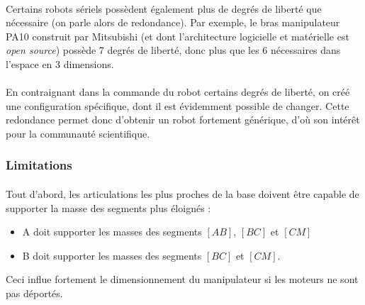 \documentclass[a4paper,10pt]{article}
\begin{document}
                \paragraph{}
                    Certains robots sériels possèdent également plus de degrés de liberté 
                    que nécessaire (on parle alors de redondance). Par exemple, le bras manipulateur
                    PA10 construit par Mitsubishi (et dont l'architecture logicielle et matérielle
                    est \textit{open source}) possède 7 degrés de liberté, donc plus que les 
                    6 nécessaires dans l'espace en 3 dimensions. 
                    
                \paragraph{}
                    En contraignant dans la commande du robot certains degrés de liberté, on créé
                    une configuration spécifique, dont il est évidemment possible de changer. Cette 
                    redondance permet donc d'obtenir un robot fortement générique, d'où son intérêt  
                    pour la communauté scientifique. 
                
            \subsubsection{Limitations}     
                \paragraph{}
                    Tout d'abord, les articulations
                    les plus proches de la base doivent être capable de supporter la masse 
                    des segments plus éloignés : 
                    
                    \begin{itemize}
                        \item A doit supporter les masses des segments $\left[AB\right]$, $\left[BC\right]$ et 
                        $\left[CM\right]$ 
                        \item B doit supporter les masses des segments $\left[BC\right]$ et $\left[CM\right]$. 
                    \end{itemize}
                    
                    Ceci influe fortement le dimensionnement du manipulateur si les moteurs
                    ne sont pas déportés. 
                
\end{document}
